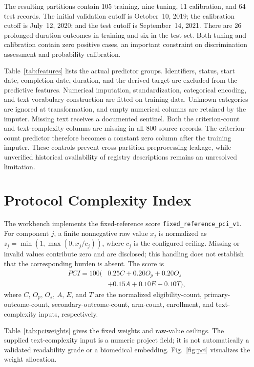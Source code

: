 \documentclass[10pt,letterpaper,twocolumn]{article}
\begin{document}
The resulting partitions contain 105 training, nine tuning, 11 calibration, and 64 test records. The initial validation cutoff is October~10, 2019; the calibration cutoff is July~12, 2020; and the test cutoff is September~14, 2021. There are 26 prolonged-duration outcomes in training and six in the test set. Both tuning and calibration contain zero positive cases, an important constraint on discrimination assessment and probability calibration.

Table~\ref{tab:features} lists the actual predictor groups. Identifiers, status, start date, completion date, duration, and the derived target are excluded from the predictive features. Numerical imputation, standardization, categorical encoding, and text vocabulary construction are fitted on training data. Unknown categories are ignored at transformation, and empty numerical columns are retained by the imputer. Missing text receives a documented sentinel. Both the criterion-count and text-complexity columns are missing in all 800 source records. The criterion-count predictor therefore becomes a constant zero column after the training imputer. These controls prevent cross-partition preprocessing leakage, while unverified historical availability of registry descriptions remains an unresolved limitation.

\section{Protocol Complexity Index}

The workbench implements the fixed-reference score \texttt{fixed\_reference\_pci\_v1}. For component $j$, a finite nonnegative raw value $x_j$ is normalized as $z_j=\min(1,\max(0,x_j/c_j))$, where $c_j$ is the configured ceiling. Missing or invalid values contribute zero and are disclosed; this handling does not establish that the corresponding burden is absent. The score is
\begin{equation}
\begin{split}
PCI=100(&0.25C+0.20O_p+0.20O_s\\
       &+0.15A+0.10E+0.10T),
\end{split}
\label{eq:pci}
\end{equation}
where $C$, $O_p$, $O_s$, $A$, $E$, and $T$ are the normalized eligibility-count, primary-outcome-count, secondary-outcome-count, arm-count, enrollment, and text-complexity inputs, respectively.

Table~\ref{tab:pciweights} gives the fixed weights and raw-value ceilings. The supplied text-complexity input is a numeric project field; it is not automatically a validated readability grade or a biomedical embedding. Fig.~\ref{fig:pci} visualizes the weight allocation.
\end{document}
